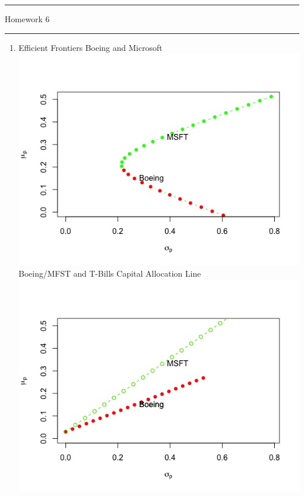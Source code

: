 \documentclass[letterpaper,12pt]{article}
\begin{document}
\thispagestyle{empty}

\hrule \vspace{0.5em}
 \hfill Homework 6 \newline \hrule

\vspace{1em}

\begin{enumerate}
\item Efficient Frontiers
 Boeing and Microsoft \\
	\includegraphics[scale = 0.6]{Boeing_MFST_EF}\\

 Boeing/MFST and T-Bills Capital Allocation Line \\
	\includegraphics[scale = 0.6]{MFST_BOEING_CAL}


\end{enumerate}
\end{document}

